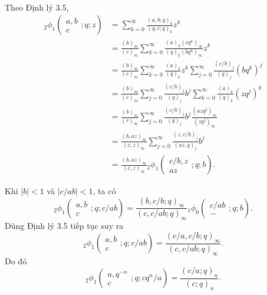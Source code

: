 \documentclass[11pt]{article}
\begin{document}
\paragraph{}
Theo Định lý 3.5,
\[
\begin{aligned}
  {}_2\phi_1
  \left(\begin{matrix}a,b\\ c\end{matrix};q;z\right)
  &=
  \sum_{k=0}^{\infty}
  \frac{(a,b;q)_k}{(q,c;q)_k}z^k                                    \\
  &=
  \frac{(b)_\infty}{(c)_\infty}
  \sum_{k=0}^{\infty}\frac{(a)_k(cq^k)_\infty}{(q)_k(bq^k)_\infty}z^k \\
  &=
  \frac{(b)_\infty}{(c)_\infty}
  \sum_{k=0}^{\infty}\frac{(a)_k}{(q)_k}z^k
  \sum_{j=0}^{\infty}\frac{(c/b)_j}{(q)_j}(bq^k)^j                    \\
  &=
  \frac{(b)_\infty}{(c)_\infty}
  \sum_{j=0}^{\infty}\frac{(c/b)_j}{(q)_j}b^j
  \sum_{k=0}^{\infty}\frac{(a)_k}{(q)_k}(zq^j)^k                      \\
  &=
  \frac{(b)_\infty}{(c)_\infty}
  \sum_{j=0}^{\infty}\frac{(c/b)_j}{(q)_j}b^j
  \frac{(azq^j)_\infty}{(zq^j)_\infty}                                \\
  &=
  \frac{(b,az)_\infty}{(c,z)_\infty}
  \sum_{j=0}^{\infty}\frac{(z,c/b)_j}{(az,q)_j}b^j                    \\
  &=
  \frac{(b,az)_\infty}{(c,z)_\infty}
  {}_2\phi_1
  \left(\begin{matrix}c/b,z\\ az\end{matrix};q;b\right).
\end{aligned}
\]

Khi \(|b|<1\) và \(|c/ab|<1\), ta có
\[
  {}_2\phi_1
  \left(\begin{matrix}a,b\\ c\end{matrix};q;c/ab\right)
  =
  \frac{(b,c/b;q)_\infty}{(c,c/ab;q)_\infty}
  {}_1\phi_0
  \left(\begin{matrix}c/ab\\ -\end{matrix};q;b\right).
\]
Dùng Định lý 3.5 tiếp tục suy ra
\[
  {}_2\phi_1
  \left(\begin{matrix}a,b\\ c\end{matrix};q;c/ab\right)
  =
  \frac{(c/a,c/b;q)_\infty}{(c,c/ab;q)_\infty}.
\]
Do đó
\[
  {}_2\phi_1
  \left(\begin{matrix}a,q^{-n}\\ c\end{matrix};q;cq^n/a\right)
  =
  \frac{(c/a;q)_n}{(c;q)_n}.
\]
\end{document}
